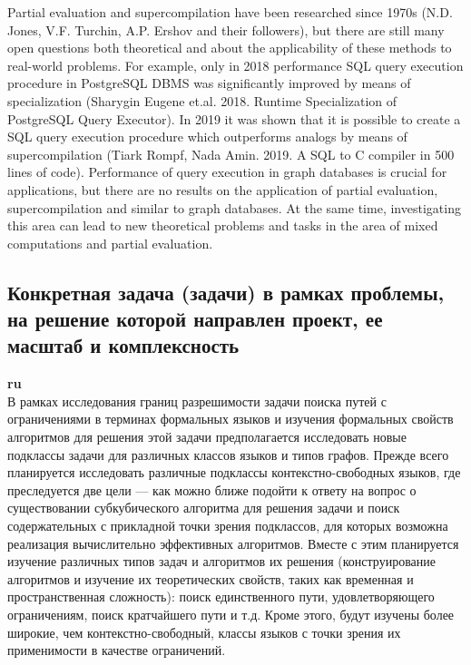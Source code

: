 \documentclass[12pt]{article}  %
\theoremstyle{remark}
\begin{document}
Partial evaluation and supercompilation have been researched since 1970s (N.D. Jones, V.F. Turchin, A.P. Ershov and their followers), but there are still many open questions both theoretical and about the applicability of these methods to real-world problems. 
For example, only in 2018 performance SQL query execution procedure in PostgreSQL DBMS was significantly improved by means of specialization (Sharygin Eugene et.al. 2018. Runtime Specialization of PostgreSQL Query Executor). 
In 2019 it was shown that it is possible to create a SQL query execution procedure which outperforms analogs by means of supercompilation (Tiark Rompf, Nada Amin. 2019. A SQL to C compiler in 500 lines of code). 
Performance of query execution in graph databases is crucial for applications, but there are no results on the application of partial evaluation, supercompilation and similar to graph databases. 
At the same time, investigating this area can lead to new theoretical problems and tasks in the area of mixed computations and partial evaluation.

\subsection{Конкретная задача (задачи) в рамках проблемы, на решение которой направлен проект, ее масштаб и комплексность}

\textbf{ru}\\
%
В рамках исследования границ разрешимости задачи поиска путей с ограничениями в терминах формальных языков и изучения формальных свойств алгоритмов для решения этой задачи предполагается исследовать новые подклассы задачи для различных классов языков и типов графов. Прежде всего планируется исследовать различные подклассы контекстно-свободных языков, где преследуется две цели --- как можно ближе подойти к ответу на вопрос о существовании субкубического алгоритма для решения задачи и поиск содержательных с прикладной точки зрения подклассов, для которых возможна реализация вычислительно эффективных алгоритмов. Вместе с этим планируется изучение различных типов задач и алгоритмов их решения (конструирование алгоритмов и изучение их теоретических свойств, таких как временная и пространственная сложность): поиск единственного пути, удовлетворяющего ограничениям, поиск кратчайшего пути и т.д. Кроме этого, будут изучены более широкие, чем контекстно-свободный, классы языков с точки зрения их применимости в качестве ограничений.
\end{document}
